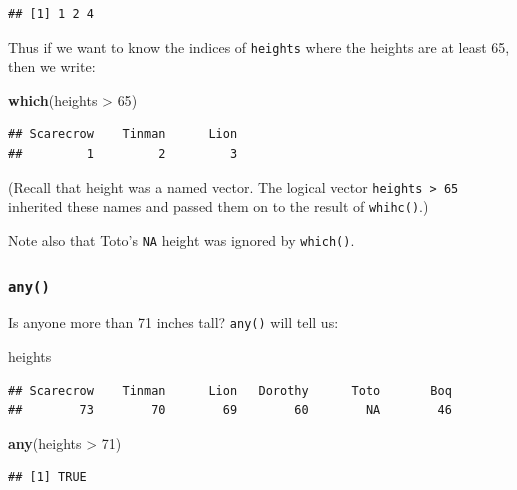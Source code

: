 \documentclass[]{book}
\makeatletter
\newenvironment{Shaded}{\begin{snugshade}}{\end{snugshade}}
\newcommand{\KeywordTok}[1]{\textcolor[rgb]{0.13,0.29,0.53}{\textbf{{#1}}}}
\newcommand{\DecValTok}[1]{\textcolor[rgb]{0.00,0.00,0.81}{{#1}}}
\newcommand{\StringTok}[1]{\textcolor[rgb]{0.31,0.60,0.02}{{#1}}}
\newcommand{\NormalTok}[1]{{#1}}
\newenvironment{kframe}{%
\medskip{}
\setlength{\fboxsep}{.8em}
 \def\at@end@of@kframe{}%
 \ifinner\ifhmode%
  \def\at@end@of@kframe{\end{minipage}}%
  \begin{minipage}{\columnwidth}%
 \fi\fi%
 \def\FrameCommand##1{\hskip\@totalleftmargin \hskip-\fboxsep
 \colorbox{shadecolor}{##1}\hskip-\fboxsep
     \hskip-\linewidth \hskip-\@totalleftmargin \hskip\columnwidth}%
 \MakeFramed {\advance\hsize-\width
   \@totalleftmargin\z@ \linewidth\hsize
   \@setminipage}}%
 {\par\unskip\endMakeFramed%
 \at@end@of@kframe}
\renewenvironment{Shaded}{\begin{kframe}}{\end{kframe}}
\theoremstyle{definition}
\theoremstyle{definition}
\theoremstyle{remark}
\makeatother
\begin{document}
\begin{verbatim}
## [1] 1 2 4
\end{verbatim}

Thus if we want to know the indices of \texttt{heights} where the
heights are at least 65, then we write:

\begin{Shaded}
\begin{Highlighting}[]
\KeywordTok{which}\NormalTok{(heights >}\StringTok{ }\DecValTok{65}\NormalTok{)}
\end{Highlighting}
\end{Shaded}

\begin{verbatim}
## Scarecrow    Tinman      Lion 
##         1         2         3
\end{verbatim}

(Recall that height was a named vector. The logical vector
\texttt{heights\ \textgreater{}\ 65} inherited these names and passed
them on to the result of \texttt{whihc()}.)

Note also that Toto's \texttt{NA} height was ignored by
\texttt{which()}.

\subsubsection{\texorpdfstring{\texttt{any()}}{any()}}\label{any}

Is anyone more than 71 inches tall?
\texttt{any()} will tell us:

\begin{Shaded}
\begin{Highlighting}[]
\NormalTok{heights}
\end{Highlighting}
\end{Shaded}

\begin{verbatim}
## Scarecrow    Tinman      Lion   Dorothy      Toto       Boq 
##        73        70        69        60        NA        46
\end{verbatim}

\begin{Shaded}
\begin{Highlighting}[]
\KeywordTok{any}\NormalTok{(heights >}\StringTok{ }\DecValTok{71}\NormalTok{)}
\end{Highlighting}
\end{Shaded}

\begin{verbatim}
## [1] TRUE
\end{verbatim}
\end{document}

